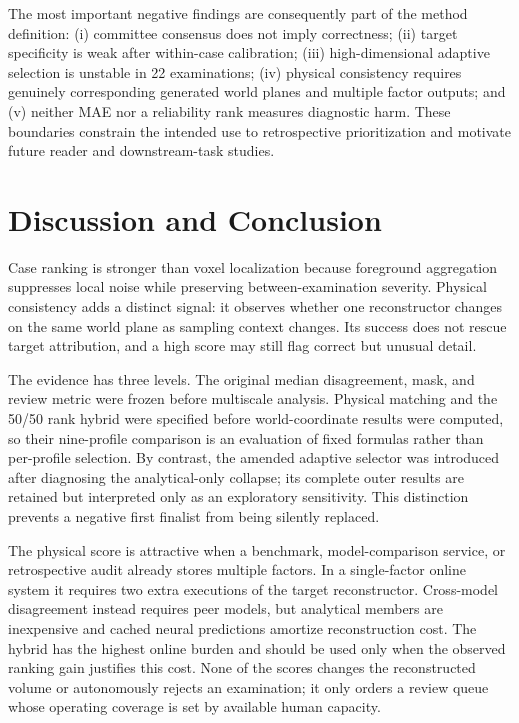 \documentclass{article}
\begin{document}
The most important negative findings are consequently part of the method definition: (i) committee consensus does not imply correctness; (ii) target specificity is weak after within-case calibration; (iii) high-dimensional adaptive selection is unstable in 22 examinations; (iv) physical consistency requires genuinely corresponding generated world planes and multiple factor outputs; and (v) neither MAE nor a reliability rank measures diagnostic harm. These boundaries constrain the intended use to retrospective prioritization and motivate future reader and downstream-task studies.

\clearpage
\section{Discussion and Conclusion}
Case ranking is stronger than voxel localization because foreground aggregation suppresses local noise while preserving between-examination severity. Physical consistency adds a distinct signal: it observes whether one reconstructor changes on the same world plane as sampling context changes. Its success does not rescue target attribution, and a high score may still flag correct but unusual detail.

The evidence has three levels. The original median disagreement, mask, and review metric were frozen before multiscale analysis. Physical matching and the 50/50 rank hybrid were specified before world-coordinate results were computed, so their nine-profile comparison is an evaluation of fixed formulas rather than per-profile selection. By contrast, the amended adaptive selector was introduced after diagnosing the analytical-only collapse; its complete outer results are retained but interpreted only as an exploratory sensitivity. This distinction prevents a negative first finalist from being silently replaced.

The physical score is attractive when a benchmark, model-comparison service, or retrospective audit already stores multiple factors. In a single-factor online system it requires two extra executions of the target reconstructor. Cross-model disagreement instead requires peer models, but analytical members are inexpensive and cached neural predictions amortize reconstruction cost. The hybrid has the highest online burden and should be used only when the observed ranking gain justifies this cost. None of the scores changes the reconstructed volume or autonomously rejects an examination; it only orders a review queue whose operating coverage is set by available human capacity.
\end{document}
